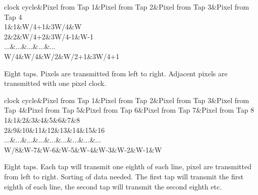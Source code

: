 \begin{Desc}
\begin{description}
\begin{TabularC}{5}
\hline
clock cycle&Pixel from Tap 1&Pixel from Tap 2&Pixel from Tap 3&Pixel from Tap 4 \\
1&1&W/4+1&3\+W/4&W \\
2&2&W/4+2&3\+W/4-\/1&W-\/1 \\
...&...&...&...&... \\
W/4&W/4&W/2&W/2+1&3\+W/4+1 \\
\end{TabularC}
\item[{\em 
\hypertarget{group___device_specific_interface_gga25ba65893f1ee0e7de99cb51bb858d99ad8f17bf247977e8623f074204e068590}{cltxg1\+X8}\label{group___device_specific_interface_gga25ba65893f1ee0e7de99cb51bb858d99ad8f17bf247977e8623f074204e068590}
}]Eight taps. Pixels are transmitted from left to right. Adjacent pixels are transmitted with one pixel clock. \begin{TabularC}{9}
\hline
clock cycle&Pixel from Tap 1&Pixel from Tap 2&Pixel from Tap 3&Pixel from Tap 4&Pixel from Tap 5&Pixel from Tap 6&Pixel from Tap 7&Pixel from Tap 8 \\
1&1&2&3&4&5&6&7&8 \\
2&9&10&11&12&13&14&15&16 \\
...&...&...&...&...&...&...&...&... \\
W/8&W-\/7&W-\/6&W-\/5&W-\/4&W-\/3&W-\/2&W-\/1&W \\
\end{TabularC}
\item[{\em 
\hypertarget{group___device_specific_interface_gga25ba65893f1ee0e7de99cb51bb858d99a8a02cbc27f41153fc368296221df12cb}{cltxg8\+X}\label{group___device_specific_interface_gga25ba65893f1ee0e7de99cb51bb858d99a8a02cbc27f41153fc368296221df12cb}
}]Eight taps. Each tap will transmit one eighth of each line, pixel are transmitted from left to right. Sorting of data needed. The first tap will transmit the first eighth of each line, the second tap will transmit the second eighth etc.


\end{description}
\end{Desc}
